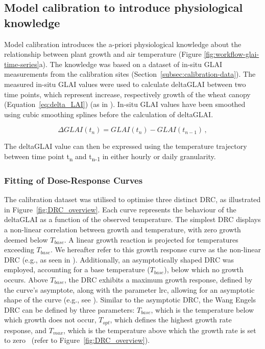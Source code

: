 \subsection{Model calibration to introduce physiological knowledge}
\label{subsec:model-cal}

Model calibration introduces the a-priori physiological knowledge about the relationship between plant growth and air temperature (Figure \ref{fig:workflow-glai-time-series}a). The knowledge was based on a dataset of in-situ \gls{GLAI} measurements from the calibration sites (Section~\ref{subsec:calibration-data}). The measured in-situ \gls{GLAI} values were used to calculate \gls{deltaGLAI} between two time points, which represent increase, respectively growth of the wheat canopy (Equation~\ref{eq:delta_LAI}) (as in \cite{tschurr_frost_2023}). In-situ \gls{GLAI} values have been smoothed using cubic smoothing splines before the calculation of \gls{deltaGLAI}.

\begin{equation}
\label{eq:delta_LAI}
  \Delta GLAI(t_n) =  GLAI(t_{n}) - GLAI(t_{n-1})\,,
\end{equation}

The \gls{deltaGLAI} value can then be expressed using the temperature trajectory between time point t\textsubscript{n} and t\textsubscript{n-1} in either hourly or daily granularity.

\subsubsection{Fitting of Dose-Response Curves}
\label{subsubsec:fitting-drc}
The calibration dataset was utilised to optimise three distinct \gls{DRC}, as illustrated in Figure~\ref{fig:DRC_overview}. Each curve represents the behaviour of the \gls{deltaGLAI} as a function of the observed temperature. The simplest \gls{DRC} displays a non-linear correlation between growth and temperature, with zero growth deemed below $T_{base}$. A linear growth reaction is projected for temperatures exceeding $T_{base}$. We hereafter refer to this growth response curve as the non-linear DRC (e.g., as seen in \cite{roth_field_2023}). Additionally, an asymptotically shaped DRC was employed, accounting for a base temperature ($T_{base}$), below which no growth occurs. Above $T_{base}$, the DRC exhibits a maximum growth response, defined by the curve's asymptote, along with the parameter lrc, allowing for an asymptotic shape of the curve (e.g., see \cite{roth_phenomics_2022}). Similar to the asymptotic \gls{DRC}, the Wang Engels \gls{DRC} can be defined by three parameters: $T_{base}$, which is the temperature below which growth does not occur, $T_{opt}$, which defines the highest growth rate response, and $T_{max}$, which is the temperature above which the growth rate is set to zero~\citep{wang_simulation_1998, wang_uncertainty_2017} (refer to Figure~\ref{fig:DRC_overview}).

